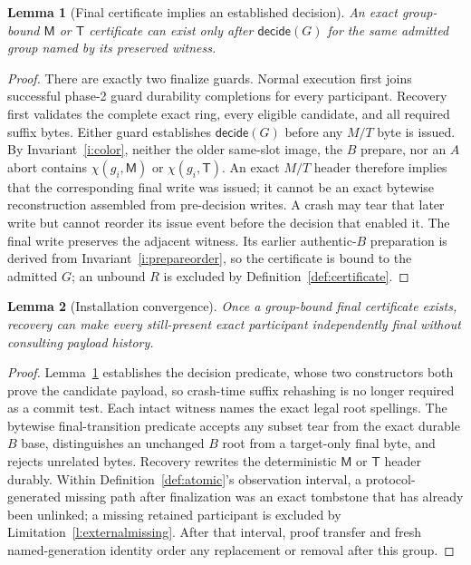 \documentclass[10pt,twocolumn]{article}
\newtheorem{lemma}{Lemma}
\theoremstyle{remark}
\newcommand{\Materialized}{\mathsf{M}}
\newcommand{\Tombstone}{\mathsf{T}}
\begin{document}
\begin{lemma}[Final certificate implies an established decision]\label{lem:certificate}
An exact group-bound $\Materialized$ or $\Tombstone$ certificate can exist only after
$\mathsf{decide}(G)$ for the same admitted group named by its preserved witness.
\end{lemma}
\begin{proof}
There are exactly two finalize guards. Normal execution first joins successful phase-2 guard
durability completions for every participant. Recovery first validates the complete exact ring, every eligible
candidate, and all required suffix bytes. Either guard establishes $\mathsf{decide}(G)$ before any
$M/T$ byte is issued. By Invariant~\ref{i:color}, neither the older same-slot image, the $B$ prepare,
nor an $A$ abort contains $\chi(g_i,\Materialized)$ or $\chi(g_i,\Tombstone)$. An exact $M/T$
header therefore implies that the corresponding final write was issued; it cannot be an
exact bytewise reconstruction assembled from pre-decision writes. A crash may tear that later
write but cannot reorder its issue event before the decision that enabled it. The final write preserves the adjacent
witness. Its earlier authentic-$B$ preparation is derived from Invariant~\ref{i:prepareorder}, so
the certificate is bound to the admitted $G$; an unbound $R$ is excluded by
Definition~\ref{def:certificate}.
\end{proof}

\begin{lemma}[Installation convergence]\label{lem:install}
Once a group-bound final certificate exists, recovery can make every still-present exact participant
independently final without consulting payload history.
\end{lemma}
\begin{proof}
Lemma~\ref{lem:certificate} establishes the decision predicate, whose two constructors both prove
the candidate payload, so crash-time suffix rehashing is no longer required as a commit test. Each
intact witness names the exact legal root
spellings. The bytewise final-transition predicate accepts any subset tear from the exact durable
$B$ base, distinguishes an unchanged $B$ root from a target-only final byte, and rejects unrelated
bytes. Recovery rewrites the deterministic $\Materialized$ or $\Tombstone$
header durably. Within Definition~\ref{def:atomic}'s observation interval, a protocol-generated missing path
after finalization was an exact tombstone that has already been unlinked; a missing retained
participant is excluded by Limitation~\ref{l:externalmissing}. After that interval, proof transfer
and fresh named-generation identity order any replacement or removal after this group.
\end{proof}
\end{document}
